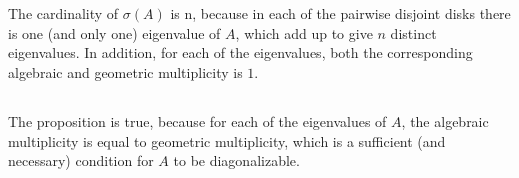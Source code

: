 \documentclass[11pt]{article}
\begin{document}
\maketitle
\section{}

\section{}
\subsection{}
The cardinality of $\sigma(A)$ is n, because in each of the pairwise disjoint disks there is one (and only one) eigenvalue of $A$, which add up to give $n$ distinct eigenvalues. In addition, for each of the eigenvalues, both the corresponding algebraic and geometric multiplicity is $1$.

\subsection{}
The proposition is true, because for each of the eigenvalues of $A$, the algebraic multiplicity is equal to geometric multiplicity, which is a sufficient (and necessary) condition for $A$ to be diagonalizable.
\end{document}
